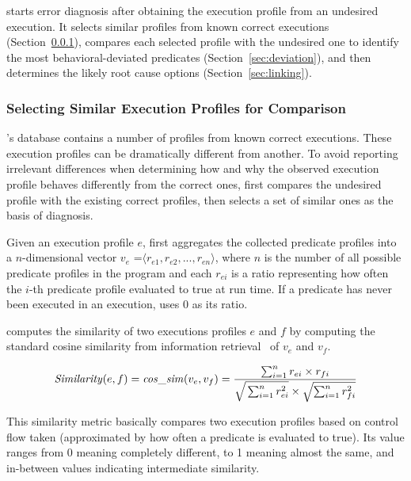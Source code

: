 \ourtool starts error diagnosis after obtaining the execution profile from
an undesired execution. It selects similar
profiles from known correct executions (Section~\ref{sec:similar}), compares
each selected profile with
the undesired one to identify the most behavioral-deviated predicates
(Section~\ref{sec:deviation}), and then determines
the likely root cause options (Section~\ref{sec:linking}).


\subsubsection{Selecting Similar Execution Profiles for Comparison}
\label{sec:similar}

\ourtool's database contains a number of
profiles from known correct executions.  These execution profiles 
can be dramatically different from another.  To avoid reporting irrelevant
differences when 
determining how and why the observed execution profile behaves
differently from the correct ones, \ourtool first
compares the undesired profile with the existing
correct profiles, then selects a set of similar ones
as the basis of diagnosis.

Given an execution profile $e$, \ourtool first aggregates
the collected predicate profiles into a $n$-dimensional
vector $v_e$ =$\langle r_{e1}, r_{e2}, ..., r_{en}\rangle$, where $n$
is the number of all possible predicate profiles in the program
and each $r_{ei}$ is a ratio representing how often the $i$-th predicate
profile evaluated to true at run time.
If a predicate has never been executed in an execution,
\ourtool uses 0 as its ratio. 

\ourtool computes the similarity of two executions profiles $e$ and $f$
by computing the standard cosine similarity from information retrieval~\cite{Witten96managinggigabytes}
of $v_{e}$ and $v_{f}$.

\vspace{-3mm}

{\small{
\[
\|Similarity|(e, f) = \|cos\_sim|(v_{e}, v_{f}) = \frac{\sum_{i = 1}^{n}r_{ei} \times r_{fi}}
{\sqrt{\strut \sum_{i = 1}^{n}r_{ei}^2} \times \sqrt{\sum_{i = 1}^{n}r_{fi}^2}}
\]
}}

\vspace{-3mm}

This similarity metric basically compares two execution profiles based on
 control flow taken (approximated by how often a predicate is evaluated to
true). Its value ranges from 0 meaning completely different, to 1 meaning almost the same, 
and in-between values indicating intermediate similarity.


